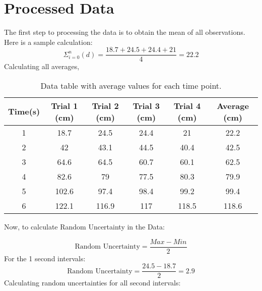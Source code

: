 \documentclass[12pt, letterpaper]{article}
\begin{document}
\section{Processed Data}
The first step to processing the data is to obtain the mean of all observations. Here is a sample calculation:
\[
\Sigma_{i=0}^n (d) =\frac{18.7+24.5+24.4+21}{4} = 22.2
\]
Calculating all averages,
\begin{table}[h!]
\centering
\begin{tabular}{|c|c|c|c|c|c|}
\hline
\textbf{Time(s)} & \textbf{Trial 1 (cm)} & \textbf{Trial 2 (cm)} & \textbf{Trial 3 (cm)} & \textbf{Trial 4 (cm)} & \textbf{Average (cm)} \\ \hline
1                & 18.7       & 24.5       & 24.4       & 21         & 22.2        \\ \hline
2                & 42         & 43.1       & 44.5       & 40.4       & 42.5        \\ \hline
3                & 64.6       & 64.5       & 60.7       & 60.1       & 62.5        \\ \hline
4                & 82.6       & 79         & 77.5       & 80.3       & 79.9        \\ \hline
5                & 102.6      & 97.4       & 98.4       & 99.2       & 99.4        \\ \hline
6                & 122.1      & 116.9      & 117        & 118.5      & 118.6       \\ \hline
\end{tabular}
\caption{Data table with average values for each time point.}
\end{table}

Now, to calculate Random Uncertainty in the Data:

\[
\text{Random Uncertainty} = \frac{Max - Min}{2} 
\]
For the 1 second intervals:
\[
\text{Random Uncertainty} = \frac{24.5 -18.7}{2} = 2.9
\]
Calculating random uncertainties for all second intervals:
\end{document}
